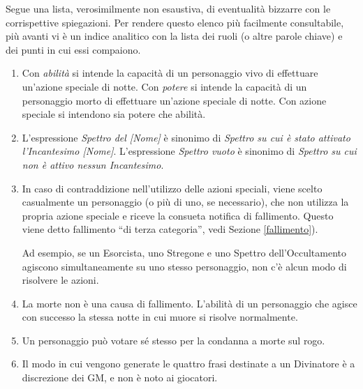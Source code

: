\documentclass[a4paper,10pt]{article}
\begin{document}
Segue una lista, verosimilmente non esaustiva, di eventualità bizzarre con le corrispettive spiegazioni.
Per rendere questo elenco più facilmente consultabile, più avanti vi è un indice analitico con la lista dei ruoli (o altre parole chiave) e dei punti in cui essi compaiono.

\begin{enumerate}
	
	\item Con \emph{abilità} si intende la capacità di un personaggio vivo di effettuare un'azione speciale di notte. Con \emph{potere} si intende la capacità di un personaggio morto di effettuare un'azione speciale di notte. Con azione speciale si intendono sia potere che abilità.
	
	\item L'espressione \emph{Spettro del [Nome]} è sinonimo di \emph{Spettro su cui è stato attivato l'Incantesimo [Nome]}. L'espressione \emph{Spettro vuoto} è sinonimo di \emph{Spettro su cui non è attivo nessun Incantesimo}.
	
	\item In caso di contraddizione nell'utilizzo delle azioni speciali, viene scelto casualmente un personaggio (o più di uno, se necessario), che non utilizza la propria azione speciale e riceve la consueta notifica di fallimento. Questo viene detto fallimento ``di terza categoria'', vedi Sezione \ref{fallimento}).
 
	Ad esempio, se un Esorcista, uno Stregone e uno Spettro dell'Occultamento agiscono simultaneamente su uno stesso personaggio, non c'è alcun modo di risolvere le azioni.
	
	\item La morte non è una causa di fallimento. L'abilità di un personaggio che agisce con successo la stessa notte in cui muore si risolve normalmente.
	
	\item Un personaggio può votare sé stesso per la condanna a morte sul rogo.
	
	\item Il modo in cui vengono generate le quattro frasi destinate a un Divinatore è a discrezione dei GM, e non è noto ai giocatori.
	

\end{enumerate}
\end{document}
